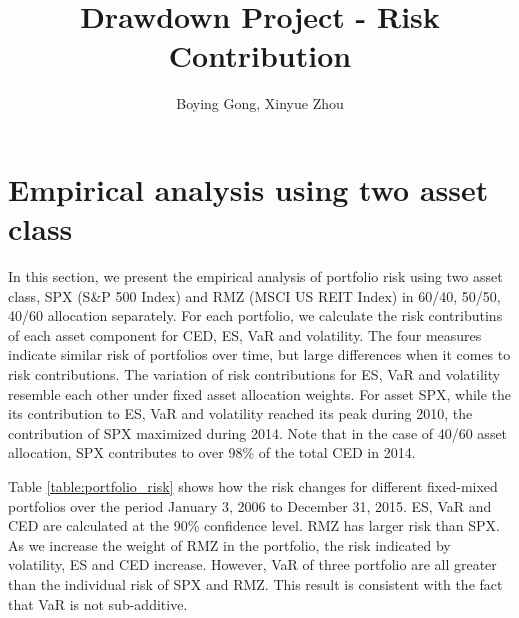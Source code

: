 \documentclass[11pt]{article}
\title{Drawdown Project - Risk Contribution}
\author{Boying Gong, Xinyue Zhou}
\begin{document}
\maketitle

\tableofcontents

\clearpage

\section{Empirical analysis using two asset class}

In this section, we present the empirical analysis of portfolio risk using two asset class, SPX (S\&P 500 Index) and RMZ (MSCI US REIT Index) in 60/40, 50/50, 40/60 allocation separately. For each portfolio, we calculate the risk contributins of each asset component for CED, ES, VaR and volatility. The four measures indicate similar risk of portfolios over time, but large differences when it comes to risk contributions. The variation of risk contributions for ES, VaR and volatility resemble each other under fixed asset allocation weights. For asset SPX, while the its contribution to ES, VaR and volatility reached its peak during 2010, the contribution of SPX maximized during 2014. Note that in the case of 40/60 asset allocation, SPX contributes to over 98\% of the total CED in 2014. 

Table \ref{table:portfolio_risk} shows how the risk changes for different fixed-mixed portfolios over the period January 3, 2006 to December 31, 2015. ES, VaR and CED are calculated at the 90\% confidence level. RMZ has larger risk than SPX. As we increase the weight of RMZ in the portfolio, the risk indicated by volatility, ES and CED increase. However, VaR of three portfolio are all greater than the individual risk of SPX and RMZ. This result is consistent with the fact that VaR is not sub-additive.
\end{document}
